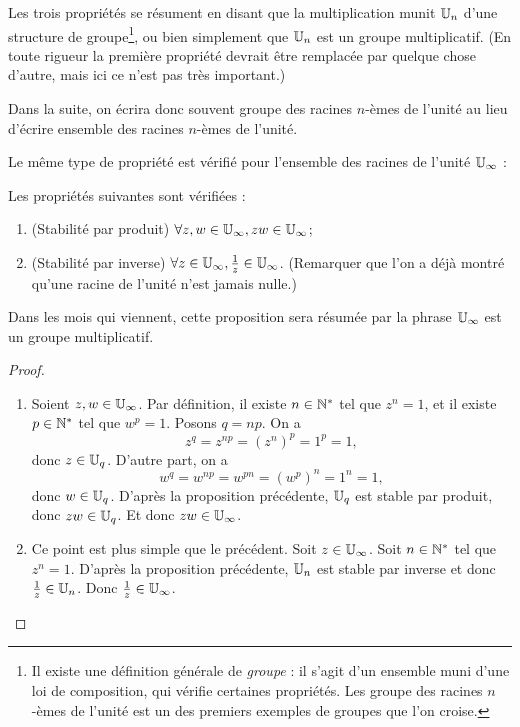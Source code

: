 Les trois propriétés se résument en disant que \og la multiplication munit $\mathbb{U}_n$ d'une structure de groupe\footnote{Il existe une définition générale de \emph{groupe} : il s'agit d'un ensemble muni d'une loi de composition, qui vérifie certaines propriétés. Les groupe des racines $n$-èmes de l'unité est un des premiers exemples de groupes que l'on croise.}\fg, ou bien simplement que \og $\mathbb{U}_n$ est un groupe multiplicatif\fg. (En toute rigueur la première propriété devrait être remplacée par quelque chose d'autre, mais ici ce n'est pas très important.)

Dans la suite, on écrira donc souvent \og groupe des racines $n$-èmes de l'unité\fg{} au lieu d'écrire \og ensemble des racines $n$-èmes de l'unité\fg.

Le même type de propriété est vérifié pour l'ensemble des racines de l'unité $\mathbb{U}_\infty$ : 

\begin{proposition}
Les propriétés suivantes sont vérifiées :
\begin{enumerate}
\item (Stabilité par produit) $\forall z, w\in\mathbb{U}_\infty, zw\in\mathbb{U}_\infty$;
\item (Stabilité par inverse) $\forall z\in\mathbb{U}_\infty, \frac{1}{z} \in\mathbb{U}_\infty$. (Remarquer que l'on a déjà montré qu'une racine de l'unité n'est jamais nulle.)
\end{enumerate}
\end{proposition}
\begin{remarque}
Dans les mois qui viennent, cette proposition sera résumée par la phrase \og $\mathbb{U}_\infty$ est un groupe multiplicatif.\fg
\end{remarque}

\begin{proof}
\begin{enumerate}
\item Soient $z, w\in\mathbb{U}_\infty$. Par définition, il existe $n\in\mathbb{N}^*$ tel que $z^n=1$, et il existe $p\in \mathbb{N}^*$ tel que $w^p=1$. Posons $q=np$. On a 
\[ z^q=z^{np}=(z^n)^p=1^p=1,\]
donc $z\in \mathbb{U}_q$. D'autre part, on a 
\[ w^q = w^{np} = w^{pn} = (w^p)^n = 1^n=1,\]
donc $w\in \mathbb{U}_q$. D'après la proposition précédente, $\mathbb{U}_q$ est stable par produit, donc $zw \in \mathbb{U}_q$. Et donc $zw\in\mathbb{U}_\infty$.
\item Ce point est plus simple que le précédent. Soit $z\in\mathbb{U}_\infty$. Soit $n\in\mathbb{N}^*$ tel que $z^n=1$. D'après la proposition précédente, $\mathbb{U}_n$ est stable par inverse et donc $\frac{1}{z} \in \mathbb{U}_n$. Donc $\frac{1}{z} \in\mathbb{U}_\infty$.
\end{enumerate}
\end{proof}

